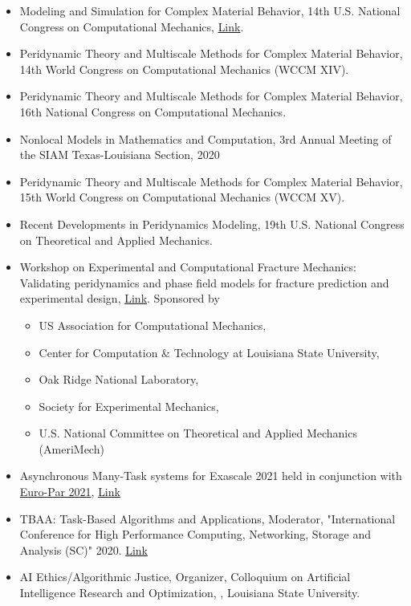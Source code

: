 \documentclass[11pt,a4paper,sans]{moderncv}
\begin{document}
\begin{itemize}[leftmargin=4cm]
\item Modeling and Simulation for Complex Material Behavior, 14th U.S. National Congress on Computational Mechanics, \href{http://14.usnccm.org/MS402}{Link}.
\item Peridynamic Theory and Multiscale Methods for Complex Material Behavior, 14th World Congress on Computational Mechanics (WCCM XIV).
\item Peridynamic Theory and Multiscale Methods for Complex Material Behavior, 16th National Congress on Computational Mechanics. 
\item Nonlocal Models in Mathematics and Computation, 3rd Annual Meeting of the SIAM Texas-Louisiana Section, 2020 
\item Peridynamic Theory and Multiscale Methods for Complex Material Behavior, 15th World Congress on Computational Mechanics (WCCM XV).
\item Recent Developments in Peridynamics Modeling, 19th U.S. National Congress on Theoretical and Applied Mechanics.
\end{itemize}

\begin{itemize}[leftmargin=4cm]
\item Workshop on Experimental and Computational Fracture Mechanics:  Validating peridynamics and phase field models for fracture
prediction and experimental design, \href{http://wfm2020.usacm.org/}{Link}. Sponsored by
\begin{itemize}
\item US Association for Computational Mechanics,
\item Center for Computation \& Technology at Louisiana State University, 
\item Oak Ridge National Laboratory,
\item Society for Experimental Mechanics,
\item U.S. National Committee on Theoretical and Applied Mechanics (AmeriMech)
\end{itemize}
\item Asynchronous Many-Task systems for Exascale 2021 held in conjunction with \href{https://2021.euro-par.org/}{Euro-Par 2021}, \href{https://amte2021.stellar-group.org}{Link}
\end{itemize}

\begin{itemize}[leftmargin=4cm]
\item TBAA: Task-Based Algorithms and Applications, Moderator, "International Conference for High Performance Computing, Networking, Storage and Analysis (SC)" 2020. \href{https://stellar-group.org/research/tbaa2020-scpanel/}{Link}
\item AI Ethics/Algorithmic Justice, Organizer, Colloquium on Artificial Intelligence Research and Optimization, , Louisiana State University. 
\end{itemize}
\end{document}
